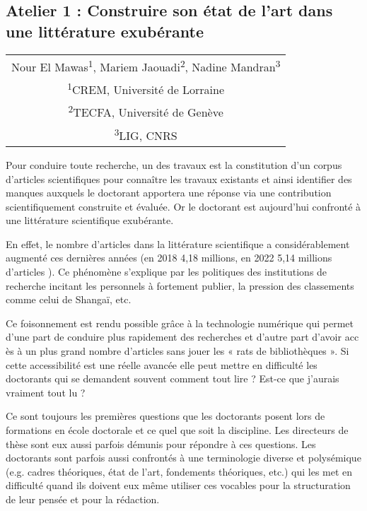 \vspace*{2em}
\begin{center}
	\subsection{Atelier 1 : Construire son état de l’art dans une littérature exubérante}
\end{center}


\vspace{1em}
\begin{center}
	\begin{tabular}{@{}c@{}}
		Nour El Mawas\textsuperscript{1}, Mariem Jaouadi\textsuperscript{2}, Nadine Mandran\textsuperscript{3}\\
		\textsuperscript{1}CREM, Université de Lorraine\\
		\textsuperscript{2}TECFA, Université de Genève\\
		\textsuperscript{3}LIG, CNRS
	\end{tabular}
\end{center}

\vspace{2em}

Pour conduire toute recherche, un des travaux est la constitution d’un corpus d’articles scientifiques pour connaître les travaux existants et ainsi identifier des manques auxquels le doctorant apportera une réponse via une contribution scientifiquement construite et évaluée. Or le doctorant est aujourd’hui confronté à une littérature scientifique exubérante.

En effet, le nombre d’articles dans la littérature scientifique a considérablement augmenté ces dernières années (en 2018 4,18 millions, en 2022 5,14 millions d’articles ). Ce phénomène s’explique par les politiques des institutions de recherche incitant les personnels à fortement publier, la pression des classements comme celui de Shangaï, etc.

Ce foisonnement est rendu possible grâce à la technologie numérique qui permet d'une part de conduire plus rapidement des recherches et d'autre part d’avoir acc ès à un plus grand nombre d'articles sans jouer les « rats de bibliothèques ». Si cette accessibilité est une réelle avancée elle peut mettre en difficulté les doctorants qui se demandent souvent comment tout lire ? Est-ce que j’aurais vraiment tout lu ?

Ce sont toujours les premières questions que les doctorants posent lors de formations en école doctorale et ce quel que soit la discipline. Les directeurs de thèse sont eux aussi parfois démunis pour répondre à ces questions. Les doctorants sont parfois aussi confrontés à une terminologie diverse et polysémique (e.g. cadres théoriques, état de l’art, fondements théoriques, etc.) qui les met en difficulté quand ils doivent eux même utiliser ces vocables pour la structuration de leur pensée et pour la rédaction.

